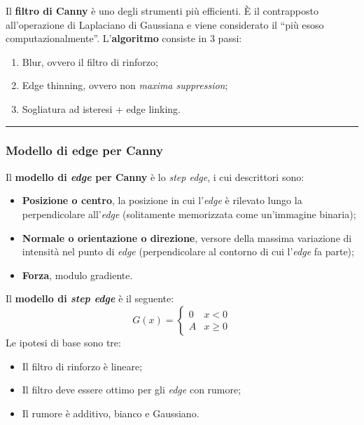 \documentclass[a4paper]{article}
\newcommand{\dquotes}[1]{``#1''}
\newcommand{\longline}{\noindent\rule{\textwidth}{0.4pt}}
\begin{document}
	Il \textcolor{Red3}{\textbf{filtro di Canny}} è uno degli strumenti più efficienti. È il contrapposto all'operazione di Laplaciano di Gaussiana e viene considerato il \dquotes{più esoso computazionalmente}. L'\textbf{algoritmo} consiste in $3$ passi:
	\begin{enumerate}
		\item Blur, ovvero il filtro di rinforzo;
		\item Edge thinning, ovvero non \emph{maxima suppression};
		\item Sogliatura ad isteresi + edge linking.
	\end{enumerate}
	
	\longline
	
	\subsubsection{Modello di edge per Canny}
	
	Il \textcolor{Red3}{\textbf{modello di \emph{edge} per Canny}} è lo \emph{step edge}, i cui descrittori sono:
	\begin{itemize}
		\item \textbf{Posizione o centro}, la posizione in cui l'\emph{edge} è rilevato lungo la perpendicolare all'\emph{edge} (solitamente memorizzata come un'immagine binaria);
		
		\item \textbf{Normale o orientazione o direzione}, versore della massima variazione di intensità nel punto di \emph{edge} (perpendicolare al contorno di cui l'\emph{edge} fa parte);
		
		\item \textbf{Forza}, modulo gradiente.
	\end{itemize}
	Il \textbf{modello di \emph{step edge}} è il seguente:
	\begin{equation*}
		G\left(x\right) = \begin{cases}
			0 & x < 0 \\
			A & x \ge 0
		\end{cases}
	\end{equation*}
	Le ipotesi di base sono tre:
	\begin{itemize}[label=-]
		\item Il filtro di rinforzo è lineare;
		\item Il filtro deve essere ottimo per gli \emph{edge} con rumore;
		\item Il rumore è additivo, bianco e Gaussiano.
	\end{itemize}
\end{document}
